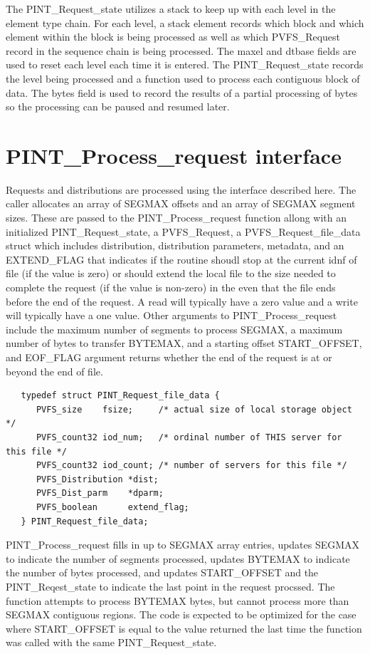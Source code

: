 \documentclass[12pt]{article} %
\begin{document}
The PINT\_Request\_state utilizes a stack to keep up with each level in the
element type chain.  For each level, a stack element records which block
and which element within the block is being processed as well as which
PVFS\_Request record in the sequence chain is being processed.  The
maxel and dtbase fields are used to reset each level each time it is
entered.  The PINT\_Request\_state records the level being processed
and a function used to process each contiguous block of data.  The bytes
field is used to record the results of a partial processing of bytes so
the processing can be paused and resumed later.

\section{PINT\_Process\_request interface}

Requests and distributions are processed using the interface described
here.  The caller allocates an array of SEGMAX offsets and an array of
SEGMAX segment sizes.  These are passed to the PINT\_Process\_request function
allong with an initialized PINT\_Request\_state, a PVFS\_Request, a
PVFS\_Request\_file\_data struct which includes distribution, distribution
parameters, metadata, and an EXTEND\_FLAG that indicates if the routine
shoudl stop at the current idnf of file (if the value is zero) or should
extend the local file to the size needed to complete the request (if the
value is non-zero) in the even that the file ends before the end of the
request. A read will typically have a zero value and a write will
typically have a one value.  Other arguments to PINT\_Process\_request
include the maximum number of segments to process SEGMAX,
a maximum number of bytes to transfer BYTEMAX,
and a starting offset START\_OFFSET, and EOF\_FLAG argument returns
whether the end of the request is at or beyond the end of file.

\begin{verbatim}
   typedef struct PINT_Request_file_data {
      PVFS_size    fsize;     /* actual size of local storage object */
      PVFS_count32 iod_num;   /* ordinal number of THIS server for this file */
      PVFS_count32 iod_count; /* number of servers for this file */
      PVFS_Distribution *dist;
      PVFS_Dist_parm    *dparm;
      PVFS_boolean      extend_flag;
   } PINT_Request_file_data;
\end{verbatim}

PINT\_Process\_request fills in up to SEGMAX array entries, updates
SEGMAX to indicate the number of segments processed, updates BYTEMAX
to indicate the number of bytes processed, and updates START\_OFFSET and the
PINT\_Reqest\_state to indicate the last point in the request procssed.
The function attempts to process BYTEMAX bytes, but cannot process more
than SEGMAX contiguous regions.  The code is expected to be optimized
for the case where START\_OFFSET is equal to the value returned the last time
the function was called with the same PINT\_Request\_state.
\end{document}

